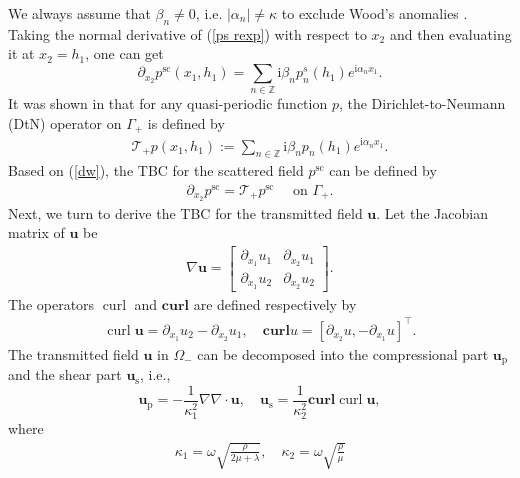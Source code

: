 \documentclass[final,3p,times]{elsarticle}
\begin{document}
We always assume that $\beta_n \neq 0$, i.e. $\left|\alpha_n\right| \neq \kappa$ to exclude Wood’s anomalies \cite{Bao22}.  Taking the normal derivative of (\ref{ps rexp}) with respect to $x_2$ and then evaluating it at $x_2=h_1$, one can get
\begin{equation*}
	\partial_{x_2} p^\mathrm{sc}(x_1,h_1)=\sum_{n \in \mathbb{Z}} \mathrm{i} \beta_n p^s_n(h_1) e^{\mathrm{i} \alpha_n {x_1}}.
\end{equation*}
It was shown in \cite{Wang15} that for any quasi-periodic function $p$, the Dirichlet-to-Neumann (DtN) operator on $\Gamma_+$ is defined by
\begin{align}\label{dw}
	\mathscr{T}_+ p\left(x_1, h_1\right):=\sum_{n \in \mathbb{Z}} \mathrm{i} \beta_n p_n(h_1) e^{\mathrm{i} \alpha_n x_1}.
\end{align}
Based on (\ref{dw}), the TBC for the scattered field $p^\mathrm{sc}$ can be defined by
\begin{align}\label{pdtn}
	\partial_{x_2} p^\mathrm{sc}=\mathscr{T}_+ p^\mathrm{sc} \quad \text { on }  \Gamma_+.
\end{align}
Next, we turn to derive the TBC for the transmitted field $\boldsymbol{u}$. Let the Jacobian matrix of $\boldsymbol{u}$ be
\begin{align*}
	\nabla \boldsymbol{u}=\left[\begin{array}{ll}
		\partial_{x_1} u_1 & \partial_{x_2} u_1 \\
		\partial_{x_1} u_2 & \partial_{x_2} u_2
	\end{array}\right].
\end{align*}
The operators $\operatorname{curl}$ and $\textbf{curl}$ are defined respectively by
\begin{align*}
	\operatorname{curl} \boldsymbol{u}=\partial_{x_1} u_2-\partial_{x_2} u_1, \quad \textbf{curl} u=\left[\partial_{x_2} u,-\partial_{x_1} u\right]^{\top}.
\end{align*}
The transmitted field $\bm{u}$ in $\Omega_-$ can be decomposed into the compressional  part $\bm{u}_\mathrm{p}$ and the shear part $\bm{u}_\mathrm{s}$, i.e.,
\begin{equation*}
	\bm{u}_\mathrm{p}=-\frac{1}{\kappa_{1}^2} \nabla \nabla \cdot \bm{u}, \quad \bm{u}_\mathrm{s}=\frac{1}{\kappa_{2}^2}\textbf{curl}\operatorname{curl} \bm{u},
\end{equation*}
where
\begin{align*}
	\kappa_1=\omega \sqrt{\frac{\rho}{2 \mu+\lambda}}, \quad \kappa_2=\omega \sqrt{\frac{\rho}{\mu}}
\end{align*}
\end{document}
